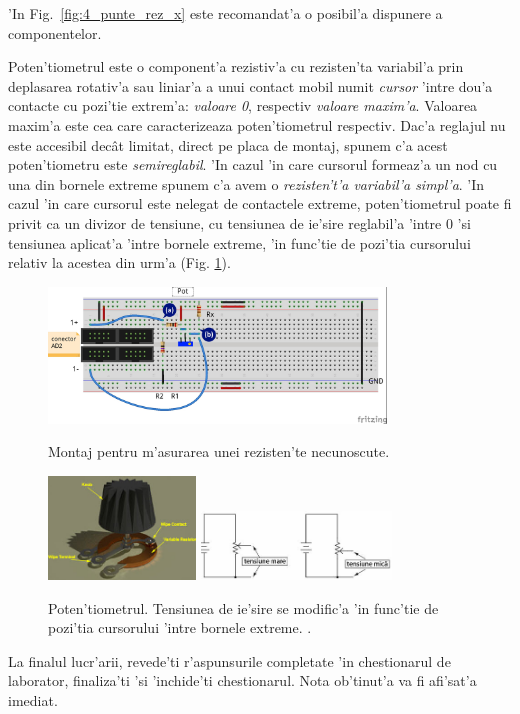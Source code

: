 \begin{indicatie}
'In Fig.~\ref{fig:4_punte_rez_x} este recomandat'a o posibil'a dispunere a componentelor.

Poten'tiometrul este o component'a rezistiv'a cu rezisten'ta variabil'a prin deplasarea rotativ'a sau liniar'a a unui contact mobil numit {\em cursor} 'intre dou'a contacte cu pozi'tie extrem'a: \textit{valoare 0}, respectiv \textit{valoare maxim'a}. Valoarea maxim'a este cea care caracterizeaza poten'tiometrul respectiv. Dac'a reglajul  nu este accesibil dec\^at limitat, direct pe placa de montaj, spunem c'a acest poten'tiometru este {\em semireglabil}. 
'In cazul 'in care cursorul formeaz'a un nod cu una din bornele extreme spunem c'a avem o {\em rezisten't'a variabil'a simpl'a}. 'In cazul 'in care cursorul este nelegat de contactele extreme, poten'tiometrul poate fi privit ca un divizor de tensiune, cu tensiunea de ie'sire reglabil'a 'intre 0 'si tensiunea aplicat'a 'intre bornele extreme, 'in func'tie de pozi'tia cursorului relativ la acestea din urm'a  (Fig. \ref{fig:potentiometru}).
\end{indicatie}

\newpage

\begin{figure}
	\centering
		\includegraphics[width=0.8\textwidth]{laborator_01/figuri/4_punte_rez_x_bb}
	\caption{Montaj pentru m'asurarea unei rezisten'te necunoscute.}
	\label{fig:4_punte_rez_x}
	\centering
		\includegraphics[width=0.35\textwidth]{laborator_01/figuri/6_potentiometru0}
		\includegraphics[width=0.45\textwidth]{laborator_01/figuri/6_potentiometru2}
	\caption{Poten'tiometrul. Tensiunea de ie'sire se modific'a 'in func'tie de pozi'tia cursorului 'intre bornele extreme. \cite{aplicatii_potentiometru}.}
	\label{fig:potentiometru}
\end{figure}
%


\begin{exercise}
La finalul lucr'arii, revede'ti r'aspunsurile completate 'in chestionarul de laborator, finaliza'ti 'si 'inchide'ti chestionarul. Nota ob'tinut'a va fi afi'sat'a imediat.
\end{exercise}





